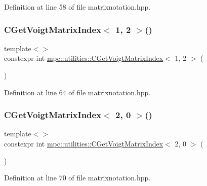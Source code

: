 Definition at line 58 of file matrixnotation.\+hpp.

\mbox{\label{namespacempc_1_1utilities_ac2da9934134d3a5867b925e1084bf1e4}} 
\subsubsection{\texorpdfstring{C\+Get\+Voigt\+Matrix\+Index$<$ 1, 2 $>$()}{CGetVoigtMatrixIndex< 1, 2 >()}}
{\footnotesize\ttfamily template$<$$>$ \\
constexpr int \mbox{\hyperlink{namespacempc_1_1utilities_ad2c3679a8e007d8b5a333490886ef19d}{mpc\+::utilities\+::\+C\+Get\+Voigt\+Matrix\+Index}}$<$ 1, 2 $>$ (\begin{DoxyParamCaption}{ }\end{DoxyParamCaption})\hspace{0.3cm}{\ttfamily [inline]}}



Definition at line 64 of file matrixnotation.\+hpp.

\mbox{\label{namespacempc_1_1utilities_a611ba0637a7bbdf72d869e716512afdb}} 
\subsubsection{\texorpdfstring{C\+Get\+Voigt\+Matrix\+Index$<$ 2, 0 $>$()}{CGetVoigtMatrixIndex< 2, 0 >()}}
{\footnotesize\ttfamily template$<$$>$ \\
constexpr int \mbox{\hyperlink{namespacempc_1_1utilities_ad2c3679a8e007d8b5a333490886ef19d}{mpc\+::utilities\+::\+C\+Get\+Voigt\+Matrix\+Index}}$<$ 2, 0 $>$ (\begin{DoxyParamCaption}{ }\end{DoxyParamCaption})\hspace{0.3cm}{\ttfamily [inline]}}



Definition at line 70 of file matrixnotation.\+hpp.

